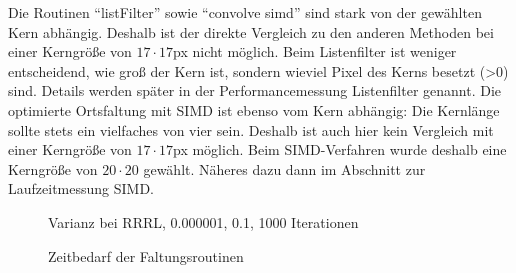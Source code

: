 \documentclass[a4paper,12pt]{article}
\begin{document}
Die Routinen "`listFilter"' sowie "`convolve simd"' sind stark von der gewählten
Kern abhängig. Deshalb ist der direkte Vergleich zu den anderen Methoden
bei einer Kerngröße von $17 \cdot 17$px nicht möglich. Beim Listenfilter ist
weniger entscheidend, wie groß der Kern ist, sondern wieviel Pixel des Kerns
besetzt (>0) sind. Details werden später in der Performancemessung Listenfilter
genannt. Die optimierte Ortsfaltung mit SIMD ist ebenso vom Kern abhängig: Die
Kernlänge sollte stets ein vielfaches von vier sein. Deshalb ist auch hier kein
Vergleich mit einer Kerngröße von $17 \cdot 17$px möglich. Beim SIMD-Verfahren
wurde deshalb eine Kerngröße von $20 \cdot 20$ gewählt. Näheres dazu dann im
Abschnitt zur Laufzeitmessung SIMD.
\begin{figure}[htbp]
\caption{Varianz bei RRRL, 0.000001, 0.1, 1000 Iterationen}%
\label{figure_konver_altes_bild}
\end{figure}

\begin{figure}[htbp]
\caption{Zeitbedarf der Faltungsroutinen}%
\label{figure_zeit_faltung}
\end{figure}  
  
\end{document}
